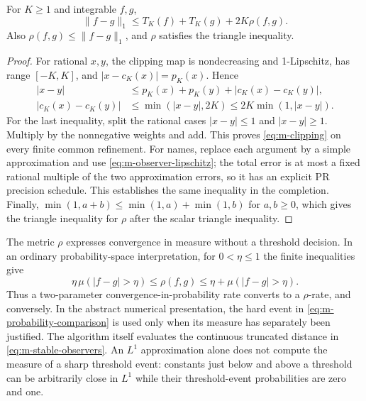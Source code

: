 \begin{lemma}
\label{lem:m-clipping}
For $K\ge1$ and integrable $f,g$,
\begin{equation}
 \|f-g\|_1\le T_K(f)+T_K(g)+2K\rho(f,g).
 \label{eq:m-clipping}
\end{equation}
Also $\rho(f,g)\le\|f-g\|_1$, and $\rho$ satisfies the triangle inequality.
\end{lemma}

\begin{proof}
For rational $x,y$, the clipping map is nondecreasing and 1-Lipschitz,
has range $[-K,K]$, and $|x-c_K(x)|=p_K(x)$.  Hence
\begin{align*}
 |x-y|&\le p_K(x)+p_K(y)+|c_K(x)-c_K(y)|,\\
 |c_K(x)-c_K(y)|&\le\min(|x-y|,2K)
                         \le2K\min(1,|x-y|).
\end{align*}
For the last inequality, split the rational cases $|x-y|\le1$ and
$|x-y|\ge1$.  Multiply by the nonnegative weights and add.  This proves
\eqref{eq:m-clipping} on every finite common refinement.  For names,
replace each argument by a simple approximation and use
\eqref{eq:m-observer-lipschitz}; the total error is at most a fixed rational
multiple of the two approximation errors, so it has an explicit PR
precision schedule.  This establishes the same inequality in the
completion.  Finally,
$\min(1,a+b)\le\min(1,a)+\min(1,b)$ for $a,b\ge0$, which gives the
triangle inequality for $\rho$ after the scalar triangle inequality.
\end{proof}

The metric $\rho$ expresses convergence in measure without a threshold
decision.  In an ordinary probability-space interpretation, for
$0<\eta\le1$ the finite inequalities give
\begin{equation}
 \eta\,\mu(|f-g|>\eta)\le\rho(f,g)
 \le\eta+\mu(|f-g|>\eta).
 \label{eq:m-probability-comparison}
\end{equation}
Thus a two-parameter convergence-in-probability rate converts to a
$\rho$-rate, and conversely.  In the abstract numerical presentation, the
hard event in \eqref{eq:m-probability-comparison} is used only when its
measure has separately been justified.  The algorithm itself evaluates
the continuous truncated distance in \eqref{eq:m-stable-observers}.
An $L^1$ approximation alone does not compute the measure of a sharp
threshold event: constants just below and above a threshold can be
arbitrarily close in $L^1$ while their threshold-event probabilities are
zero and one.

